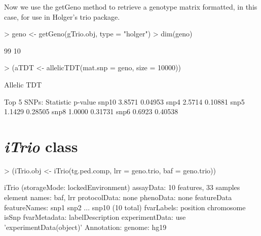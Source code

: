 \documentclass[10pt]{article}
\begin{document}
Now we use the getGeno method to retrieve a genotype matrix formatted, in this case, for use in Holger's trio package.
\begin{Schunk}
\begin{Sinput}
> geno <- getGeno(gTrio.obj, type = "holger")
> dim(geno)
\end{Sinput}
\begin{Soutput}
[1] 99 10
\end{Soutput}
\begin{Sinput}
> (aTDT <- allelicTDT(mat.snp = geno, size = 10000))
\end{Sinput}
\begin{Soutput}
      Allelic TDT

Top 5 SNPs:
      Statistic p-value
snp10    3.8571 0.04953
snp4     2.5714 0.10881
snp5     1.1429 0.28505
snp8     1.0000 0.31731
snp6     0.6923 0.40538
\end{Soutput}
\end{Schunk}
\section{\emph{iTrio} class}
\begin{Schunk}
\begin{Sinput}
> (iTrio.obj <- iTrio(tg.ped.comp, lrr = geno.trio, baf = geno.trio))
\end{Sinput}
\begin{Soutput}
iTrio (storageMode: lockedEnvironment)
assayData: 10 features, 33 samples 
  element names: baf, lrr 
protocolData: none
phenoData: none
featureData
  featureNames: snp1 snp2 ... snp10 (10 total)
  fvarLabels: position chromosome isSnp
  fvarMetadata: labelDescription
experimentData: use 'experimentData(object)'
Annotation:  
genome:  hg19 
\end{Soutput}
\end{Schunk}
\end{document}
